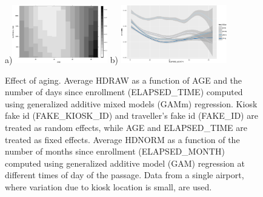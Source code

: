 \documentclass{cta-author}%
\begin{document}
\begin{figure} [!b] 
\centering
a)\includegraphics[width=0.5\linewidth,height=1in]{eps/HDNORMvsAGE-ELAPSED(inverted).eps}  
b)
\includegraphics[width=0.45\linewidth,height=1in]{eps/HDNORM=F(ELAPSE,hh)-PORT=A.eps} 

\caption{Effect of aging. 
 { 
Average HDRAW as a function of AGE and the number of days since enrollment (ELAPSED\_TIME) computed using generalized additive mixed models (GAMm) regression.  
Kiosk fake id (FAKE\_KIOSK\_ID) and traveller's fake id (FAKE\_ID) are treated as random effects, while AGE and ELAPSED\_TIME are treated as fixed effects.
}
 {  Average HDNORM as a function of the number of months since enrollment (ELAPSED\_MONTH) computed  using generalized additive model (GAM) regression  at different times of day of the passage. Data from a single airport, where variation due to kiosk location is small, are used.
}
\label{fAgingHH}}
\end{figure}
\end{document}
